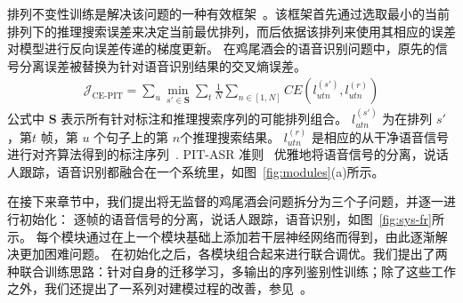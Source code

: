 排列不变性训练是解决该问题的一种有效框架~\cite{yu2017recognizing}。该框架首先通过选取最小的当前排列下的推理搜索误差来决定当前最优排列，而后依据该排列来使用其相应的误差对模型进行反向误差传递的梯度更新。
在鸡尾酒会的语音识别问题中，原先的信号分离误差被替换为针对语音识别结果的交叉熵误差。
\begin{equation}
\label{equ:ce-pit}
\begin{split}
\mathcal{J}_{\text{CE-PIT}}=\sum_u \min_{s'\in \mathbf{S}} \sum_t \frac{1}{N} \sum_{n\in[1,N]} CE({l}_{utn}^{(s')},{l}_{utn}^{(r)})
\end{split}
\end{equation}
公式中 $\mathbf{S}$ 表示所有针对标注和推理搜索序列的可能排列组合。
${l}_{utn}^{(s')}$ 为在排列 $s'$ ，第$t$ 帧，第 $u$ 个句子上的第 $n$个推理搜索结果。 ${l}_{utn}^{(r)}$ 是相应的从干净语音信号进行对齐算法得到的标注序列~\cite{woodland1994large}.
PIT-ASR 准则~\cite{yu2017recognizing} 优雅地将语音信号的分离，说话人跟踪，语音识别都融合在一个系统里，如图~\ref{fig:modules}(a)所示。

在接下来章节中，我们提出将无监督的鸡尾酒会问题拆分为三个子问题，并逐一进行初始化：
逐帧的语音信号的分离，说话人跟踪，语音识别，如图~\ref{fig:sys-fr}所示。 
每个模块通过在上一个模块基础上添加若干层神经网络而得到，由此逐渐解决更加困难问题。
在初始化之后，各模块组合起来进行联合调优。我们提出了两种联合训练思路：针对自身的迁移学习，多输出的序列鉴别性训练；除了这些工作之外，我们还提出了一系列对建模过程的改善，参见~\cite{chen2018progressive}。


